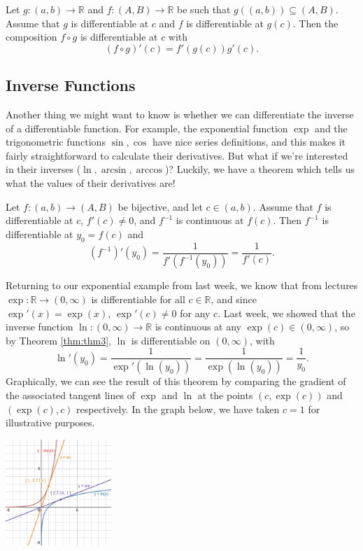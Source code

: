 \documentclass[
  10pt,
  a4paper]{article}
\theoremstyle{plain}
\theoremstyle{definition}
\theoremstyle{plain}
\theoremstyle{plain}
\theoremstyle{plain}
\theoremstyle{plain}
\theoremstyle{definition}
\theoremstyle{definition}
\theoremstyle{remark}
\theoremstyle{remark}
\let\BeginKnitrBlock\begin \let\EndKnitrBlock\end
\begin{document}
\BeginKnitrBlock{theorem}[Chain Rule]
{\label{thm:thm2} }Let \(g:(a,b) \to \mathbb{R}\) and \(f:(A,B) \to \mathbb{R}\) be such that \(g\left((a,b)\right) \subseteq (A,B).\) Assume that \(g\) is differentiable at \(c\) and \(f\) is differentiable at \(g(c)\). Then the composition \(f\circ g\) is differentiable at \(c\) with \[\left(f\circ g\right)'(c) = f'\left(g(c)\right)g'(c).\]
\EndKnitrBlock{theorem}

\hypertarget{inverse-functions}{%
\subsection{Inverse Functions}\label{inverse-functions}}

Another thing we might want to know is whether we can differentiate the inverse of a differentiable function. For example, the exponential function \(\exp\) and the trigonometric functions \(\sin, \cos\) have nice series definitions, and this makes it fairly straightforward to calculate their derivatives. But what if we're interested in their inverses (\(\ln, \arcsin, \arccos\))? Luckily, we have a theorem which tells us what the values of their derivatives are!

\BeginKnitrBlock{theorem}[Inverse Function Theorem]
{\label{thm:thm3} }Let \(f: (a,b) \to (A, B)\) be bijective, and let \(c \in (a,b).\) Assume that \(f\) is differentiable at \(c\), \(f'(c) \neq 0\), and \(f^{-1}\) is continuous at \(f(c).\) Then \(f^{-1}\) is differentiable at \(y_0 = f(c)\) and \[\left(f^{-1}\right)'(y_0) = \frac{1}{f'\left(f^{-1}(y_0)\right)} = \frac{1}{f'(c)}.\]
\EndKnitrBlock{theorem}

\BeginKnitrBlock{example}
{\label{exm:ex1} }Returning to our exponential example from last week, we know that from lectures \(\exp: \mathbb{R} \to (0,\infty)\) is differentiable for all \(c \in \mathbb{R}\), and since \(\exp'(x) = \exp(x)\), \(\exp'(c) \neq 0\) for any \(c\). Last week, we showed that the inverse function \(\ln: (0,\infty) \to \mathbb{R}\) is continuous at any \(\exp(c) \in (0,\infty)\), so by Theorem \ref{thm:thm3}, \(\ln\) is differentiable on \((0,\infty)\), with \[\ln'(y_0) = \frac{1}{\exp'(\ln(y_0))} = \frac{1}{\exp(\ln(y_0))} = \frac{1}{y_0}.\] Graphically, we can see the result of this theorem by comparing the gradient of the associated tangent lines of \(\exp\) and \(\ln\) at the points \((c,\exp(c))\) and \((\exp(c),c)\) respectively. In the graph below, we have taken \(c = 1\) for illustrative purposes.

\includegraphics[width=0.3\textwidth,height=\textheight]{./explog2.png}
\EndKnitrBlock{example}
\end{document}
